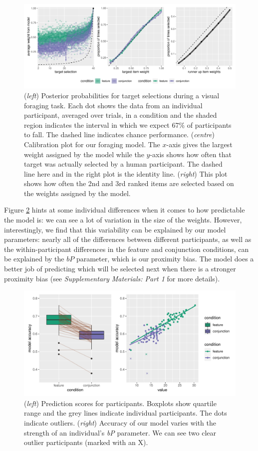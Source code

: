 \documentclass[preprints, article,submit,pdftex,moreauthors]{Definitions/mdpi}
\begin{document}
\begin{figure}[H]
\centering
\includegraphics[width=12 cm]{Figures/qjep_preds.pdf}
\caption{(\textit{left}) Posterior probabilities for target selections during a visual foraging task. Each dot shows the  data from an individual participant, averaged over trials, in a condition and the shaded region indicates the interval in which we expect 67\% of participants to fall. The dashed line indicates chance performance. (\textit{centre})  Calibration plot for our foraging model. The $x$-axis gives the largest weight assigned by the model while the $y$-axis shows how often that target was actually selected by a human participant. The dashed line here and in the right plot is the identity line. (\textit{right}) This plot shows how often the 2nd and 3rd ranked items are selected based on the weights assigned by the model.}
\label{fig:cal}
\end{figure}   

Figure \ref{fig:cal2} hints at some individual differences when it comes to how predictable the model is: we can see a lot of variation in the size of the weights. However, interestingly, we find that this variability can be explained by our model parameters: nearly all of the differences between different participants, as well as the within-participant differences in the feature and conjunction conditions, can be explained by the $bP$ parameter, which is our proximity bias. The model does a better job of predicting which will be selected next when there is a stronger proximity bias (see \textit{Supplementary Materials: Part 1} for more details).

\begin{figure}[H]
\centering
\includegraphics[width=12 cm]{Figures/qjep_indiv_diff.pdf}
\caption{(\textit{left}) Prediction scores for participants. Boxplots show quartile range and the grey lines indicate individual participants. The dots indicate outliers. (\textit{right}) Accuracy of our model varies with the strength of an individual’s \textit{bP} parameter. We can see two clear outlier participants (marked with an X).}
\label{fig:cal2}
\end{figure}   
\end{document}
